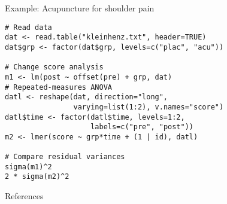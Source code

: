 \documentclass{beamer}
\begin{document}
{


\begin{frame}[fragile]{Example: Acupuncture for shoulder pain}
\begin{lstlisting}
# Read data
dat <- read.table("kleinhenz.txt", header=TRUE)
dat$grp <- factor(dat$grp, levels=c("plac", "acu"))

# Change score analysis
m1 <- lm(post ~ offset(pre) + grp, dat)
# Repeated-measures ANOVA
datl <- reshape(dat, direction="long", 
                varying=list(1:2), v.names="score")
datl$time <- factor(datl$time, levels=1:2, 
                    labels=c("pre", "post"))
m2 <- lmer(score ~ grp*time + (1 | id), datl)

# Compare residual variances
sigma(m1)^2
2 * sigma(m2)^2
\end{lstlisting}
\end{frame}

}

% 
% 
% 

\appendix
\begin{frame}{References}


\vfill
\end{frame}
\end{document}
